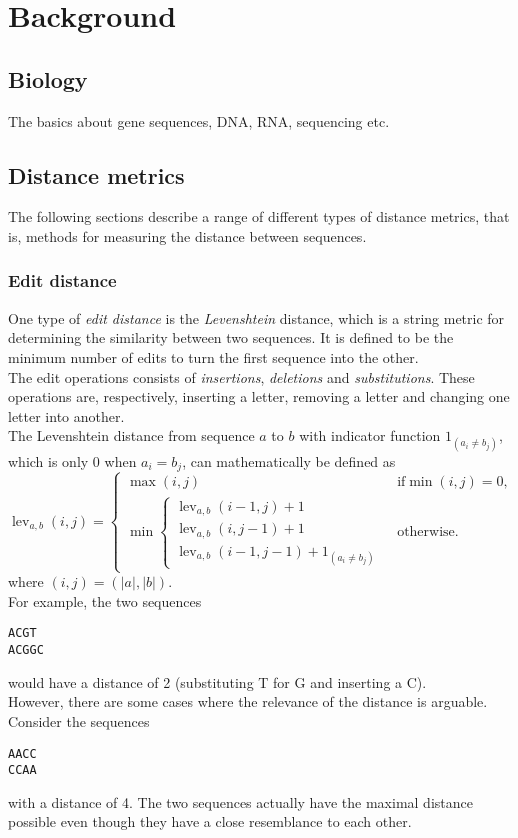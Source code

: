 \section{Background}

\subsection{Biology}
The basics about gene sequences, DNA, RNA, sequencing etc. %

\subsection{Distance metrics}
The following sections describe a range of different types of distance metrics,
that is, methods for measuring the distance between sequences.

\subsubsection{Edit distance}
One type of \emph{edit distance} is the \emph{Levenshtein} distance, which is a
string metric for determining the similarity between two sequences. It is
defined to be the minimum number of edits to turn the first sequence into the
other. \\
The edit operations consists of \emph{insertions}, \emph{deletions} and
\emph{substitutions}. These operations are, respectively, inserting a letter,
removing a letter and changing one letter into another. \\
The Levenshtein distance from sequence $a$ to $b$ with indicator function 
$1_{(a_i\neq b_j)}$, which is only $0$ when $a_i=b_j$, can mathematically be 
defined as
\begin{equation}
	\operatorname{lev}_{a,b}(i,j)= 
	\begin{cases}
	  	\max(i,j) & \text{ if} \min(i,j)=0, \\
  	  	\min \begin{cases}
        		\operatorname{lev}_{a,b}(i-1,j) + 1 \\
          	\operatorname{lev}_{a,b}(i,j-1) + 1 \\
          	\operatorname{lev}_{a,b}(i-1,j-1) + 1_{(a_i \neq b_j)}
       \end{cases} & \text{ otherwise.}
	\end{cases}
\end{equation}
where $(i,j)=(|a|,|b|)$.\\
For example, the two sequences
\begin{center}
\texttt{ACGT} \\
\texttt{ACGGC}
\end{center}
would have a distance of 2 (substituting T for G and inserting a C). \\
However, there are some cases where the relevance of the distance is arguable.
Consider the sequences
\begin{center}
\texttt{AACC} \\
\texttt{CCAA}
\end{center}
with a distance of 4. The two sequences actually have the maximal distance
possible even though they have a close resemblance to each other.


